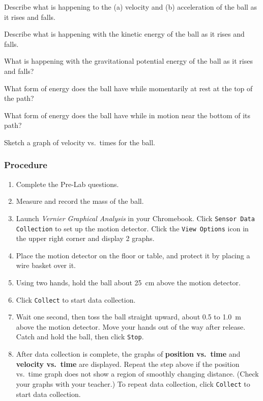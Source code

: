 \documentclass[main-physics.tex]{subfiles}
\begin{document}
\begin{exercise}
    Describe what is happening to the (a) velocity and (b) acceleration of the ball as it rises and falls.
\end{exercise}

\begin{exercise}
    Describe what is happening with the kinetic energy of the ball as it rises and falls.
\end{exercise}

\begin{exercise}
    What is happening with the gravitational potential energy of the ball as it rises and falls?
\end{exercise}

\begin{exercise}
    What form of energy does the ball have while momentarily at rest at the top of the path?
\end{exercise}

\begin{exercise}
    What form of energy does the ball have while in motion near the bottom of its path?
\end{exercise}

\begin{exercise}
    Sketch a graph of velocity vs.~times for the ball. 
\end{exercise}

\subsubsection*{Procedure}

\begin{enumerate}
\setlength\itemsep{-1ex}
    \item Complete the Pre-Lab questions.
    \item Measure and record the mass of the ball. 
    \item Launch \textit{Vernier Graphical Analysis} in your Chromebook. Click \texttt{Sensor Data Collection} to set up the motion detector. Click the \texttt{View Options} icon in the upper right corner and display 2 graphs.
    \item Place the motion detector on the floor or table, and protect it by placing a wire basket over it. 
    \item Using two hands, hold the ball about \SI{25}{cm} above the motion detector. 
    \item Click \texttt{Collect} to start data collection.
    \item Wait one second, then toss the ball straight upward, about 0.5 to \SI{1.0}{m} above the motion detector. Move your hands out of the way after release. Catch and hold the ball, then click \texttt{Stop}.
    \item After data collection is complete, the graphs of \textbf{position vs.~time} and \textbf{velocity vs.~time} are displayed. Repeat the step above if the position vs.~time graph does not show a region of smoothly changing distance. (Check your graphs with your teacher.) To repeat data collection, click \texttt{Collect} to start data collection.
\end{enumerate}
\end{document}
